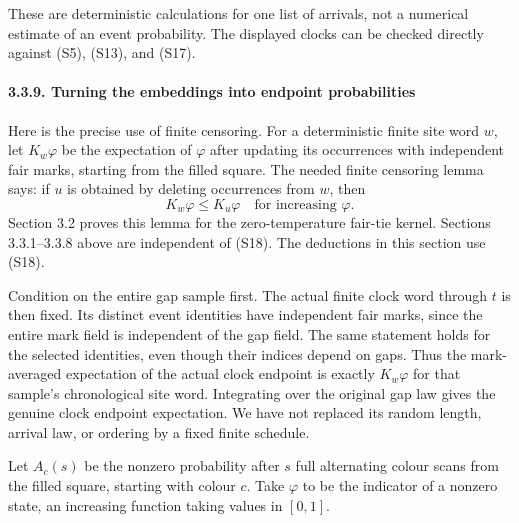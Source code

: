 \documentclass[
  11pt,
  a4paper,
]{article}
\begin{document}
These are deterministic calculations for one list of arrivals, not a
numerical estimate of an event probability. The displayed clocks can be
checked directly against (S5), (S13), and (S17).

\paragraph{3.3.9. Turning the embeddings into endpoint
probabilities}\label{turning-the-embeddings-into-endpoint-probabilities}

Here is the precise use of finite censoring. For a deterministic finite
site word \(w\), let \(K_w\varphi\) be the expectation of \(\varphi\)
after updating its occurrences with independent fair marks, starting
from the filled square. The needed finite censoring lemma says: if \(u\)
is obtained by deleting occurrences from \(w\), then \[
K_w\varphi\leq K_u\varphi\quad\text{for increasing }\varphi.
\tag{S18}
\] Section 3.2 proves this lemma for the zero-temperature fair-tie
kernel. Sections 3.3.1--3.3.8 above are independent of (S18). The
deductions in this section use (S18).

Condition on the entire gap sample first. The actual finite clock word
through \(t\) is then fixed. Its distinct event identities have
independent fair marks, since the entire mark field is independent of
the gap field. The same statement holds for the selected identities,
even though their indices depend on gaps. Thus the mark-averaged
expectation of the actual clock endpoint is exactly \(K_w\varphi\) for
that sample's chronological site word. Integrating over the original gap
law gives the genuine clock endpoint expectation. We have not replaced
its random length, arrival law, or ordering by a fixed finite schedule.

Let \(A_c(s)\) be the nonzero probability after \(s\) full alternating
colour scans from the filled square, starting with colour \(c\). Take
\(\varphi\) to be the indicator of a nonzero state, an increasing
function taking values in \([0,1]\).
\end{document}
